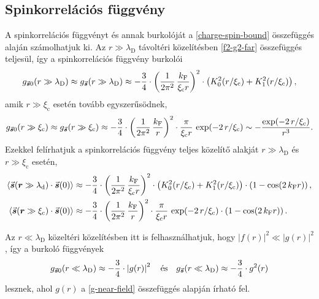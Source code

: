 \documentclass[a4paper,12pt,titlepage]{article}
\newcommand{\RR}{{\vb*{r}}}
\newcommand{\kF}{{k_\text{F}}}
\newcommand{\xic}{{\xi_\text{c}}}
\begin{document}
\subsection{Spinkorrelációs függvény}

A spinkorrelációs függvényt és annak burkolóját a \eqref{charge-spin-bound} összefüggés alaján számolhatjuk ki.  Az $r \gg \lambda_\text{D}$ távoltéri közelítésben \eqref{f2-g2-far} összefüggés teljesül, így a spinkorrelációs függvény burkolói
\begin{equation}
	g_{\va*{s} 0}(r \gg \lambda_\text{D}) \approx g_{\va*{s}}(r \gg \lambda_\text{D}) \approx -\frac{3}{4} \cdot \left( \frac{1}{2 \pi^2} \, \frac{\kF}{\xic r} \right)^2 \cdot \left( K_0^2(r / \xic) + K_1^2(r / \xic) \right),
\end{equation}
amik $r \gg \xic$ esetén tovább egyszerűsödnek,
\begin{equation}
	g_{\va*{s} 0}(r \gg \xic) \approx g_{\va*{s}}(r \gg \xic) \approx -\frac{3}{4} \cdot \left( \frac{1}{2 \pi^2} \, \frac{\kF}{r} \right)^2 \cdot \frac{\pi}{\xic r} \, \exp(-2 \, r / \xic) \sim -\frac{\exp(-2 \, r / \xic)}{r^3}.
\end{equation}
Ezekkel felírhatjuk a spinkorrelációs függvény teljes közelítő alakját $r \gg \lambda_\text{D}$ és $r \gg \xic$ esetén,
\begin{equation}
\begin{split}
	\expval{\va*{s}(\RR \gg \lambda_\text{d}) \cdot \va*{s}(0)} & \approx -\frac{3}{4} \cdot \left( \frac{1}{2 \pi^2} \, \frac{\kF}{\xic r} \right)^2 \cdot \left( K_0^2(r / \xic) + K_1^2(r / \xic) \right) \cdot \left( 1 - \cos(2 \, \kF r) \right), \\
	\expval{\va*{s}(\RR \gg \xic) \cdot \va*{s}(0)} & \approx -\frac{3}{4} \cdot \left( \frac{1}{2 \pi^2} \, \frac{\kF}{r} \right)^2 \cdot \frac{\pi}{\xic r} \, \exp(-2 \, r / \xic) \cdot \left( 1 - \cos(2 \, \kF r) \right).
\end{split}
\end{equation}

Az $r \ll \lambda_\text{D}$ közeltéri közelítésben itt is felhasználhatjuk, hogy $\left| f(r) \right|^2 \ll \left| g(r) \right|^2$, így a burkoló függvények
\begin{equation}
	g_{\va*{s} 0}(r \ll \lambda_\text{D}) \approx -\frac{3}{4} \cdot \left| g(r) \right|^2 ~~~ \text{és} ~~~ g_{\va*{s}}(r \ll \lambda_\text{D}) \approx -\frac{3}{4} \cdot g^2(r)
\end{equation}
lesznek, ahol $g(r)$ a \eqref{g-near-field} összefüggés alapján írható fel.
\end{document}
